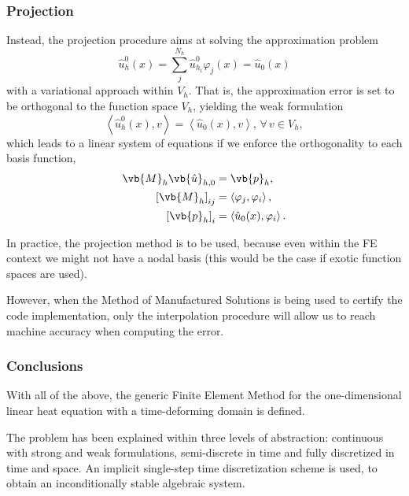 \documentclass[../../main.tex]{subfiles}
\newcommand{\inner}[2]{\left<#1, #2\right>}
\begin{document}
\subsubsection*{Projection}
Instead, the projection procedure aims at solving the approximation problem
\begin{equation}
    \hat{u}^{0}_h(x) = \sum_j^{N_h} \hat{u}_{h_i}^0 \varphi_j(x) = \hat{u}_0(x)
\end{equation}
with a variational approach within $V_h$. 
That is, the approximation error is set to be orthogonal to the function space $V_h$, yielding the weak formulation
\begin{equation}
    \inner{\hat{u}^{0}_h(x)}{v} = \inner{\hat{u}_0(x)}{v}, \, \forall \, v \in V_h,
\end{equation}
which leads to a linear system of equations if we enforce the orthogonality to each basis function,
\begin{subequations}
    \begin{align}
        \label{eq:projection_equation}
        \vb{M}_{h} \vb{\hat{u}}_{h,0} &= \vb{p}_h, \\
        \left[\vb{M}_{h}\right]_{ij} &= \inner{\varphi_j}{\varphi_i}, \\
        \left[\vb{p}_{h}\right]_{i} &= \inner{\hat{u}_0(x)}{\varphi_i}.
    \end{align}
\end{subequations}

In practice, the projection method is to be used, because even within the FE context we might not have a nodal basis (this would be the case if exotic function spaces are used).

However, when the Method of Manufactured Solutions is being used to certify the code implementation, only the interpolation procedure will allow us to reach machine accuracy when computing the error.

\subsubsection{Conclusions}
With all of the above, the generic Finite Element Method for the one-dimensional linear heat equation with a time-deforming domain is defined.

The problem has been explained within three levels of abstraction: continuous with strong and weak formulations, semi-discrete in time and fully discretized in time and space.
An implicit single-step time discretization scheme is used, to obtain an inconditionally stable algebraic system. 
\end{document}
